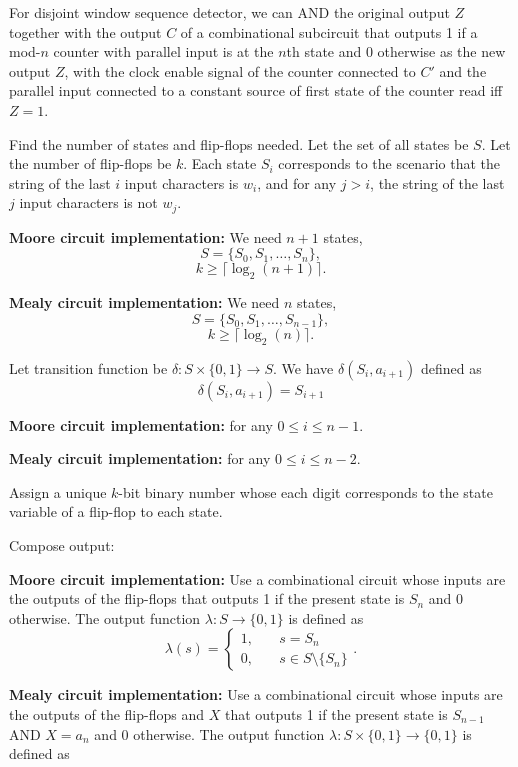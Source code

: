 \documentclass[a4paper,12pt]{report}
\begin{document}
For disjoint window sequence detector, we can AND the original output $Z$ together with the output $C$ of a combinational subcircuit that outputs 1 if a mod-$n$ counter with parallel input is at the $n$th state and 0 otherwise as the new output $Z$, with the clock enable signal of the counter connected to $C'$ and the parallel input connected to a constant source of first state of the counter read iff $Z=1$.
\ben
\item Find the number of states and flip-flops needed. Let the set of all states be $S$. Let the number of flip-flops be $k$. Each state $S_i$ corresponds to the scenario that the string of the last $i$ input characters is $w_i$, and for any $j>i$, the string of the last $j$ input characters is not $w_j$.
\bit
\item \textbf{Moore circuit implementation:} We need $n+1$ states,
\[S=\{S_0,S_1,\ldots,S_n\},\]
\[k\geq\lceil\log_2(n+1)\rceil.\]
\item \textbf{Mealy circuit implementation:} We need $n$ states,
\[S=\{S_0,S_1,\ldots,S_{n-1}\},\]
\[k\geq\lceil\log_2(n)\rceil.\]
\eit
\item Let transition function be $\delta\colon S\times\{0,1\}\to S$. We have $\delta(S_i,a_{i+1})$ defined as
\[\delta(S_i,a_{i+1})=S_{i+1}\]
\bit
\item \textbf{Moore circuit implementation:} for any $0\leq i\leq n-1$.
\item \textbf{Mealy circuit implementation:} for any $0\leq i\leq n-2$.
\eit
\item Assign a unique $k$-bit binary number whose each digit corresponds to the state variable of a flip-flop to each state.
\item Compose output:
\bit
\item\textbf{Moore circuit implementation:} Use a combinational circuit whose inputs are the outputs of the flip-flops that outputs 1 if the present state is $S_n$ and 0 otherwise. The output function $\lambda\colon S\to\{0,1\}$ is defined as
\[\lambda(s)=\begin{cases}
1,\quad&s=S_n\\
0,\quad&s\in S\setminus\{S_n\}
\end{cases}.\]
\item\textbf{Mealy circuit implementation:} Use a combinational circuit whose inputs are the outputs of the flip-flops and $X$ that outputs 1 if the present state is $S_{n-1}$ AND $X=a_n$ and 0 otherwise. The output function $\lambda\colon S\times\{0,1\}\to\{0,1\}$ is defined as
\end{document}
